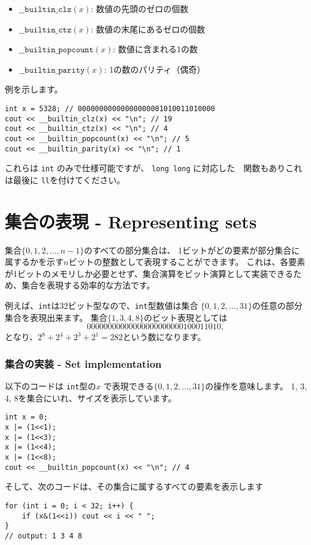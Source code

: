 \begin{itemize}
\item
$\texttt{\_\_builtin\_clz}(x)$:
数値の先頭のゼロの個数
\item
$\texttt{\_\_builtin\_ctz}(x)$:
数値の末尾にあるゼロの個数
\item
$\texttt{\_\_builtin\_popcount}(x)$:
数値に含まれる1の数
\item
$\texttt{\_\_builtin\_parity}(x)$:
1の数のパリティ（偶奇） 
\end{itemize}
\begin{samepage}

例を示します。
\begin{lstlisting}
int x = 5328; // 00000000000000000001010011010000
cout << __builtin_clz(x) << "\n"; // 19
cout << __builtin_ctz(x) << "\n"; // 4
cout << __builtin_popcount(x) << "\n"; // 5
cout << __builtin_parity(x) << "\n"; // 1
\end{lstlisting}
\end{samepage}

これらは \texttt{int} のみで仕様可能ですが、
\texttt{long long} に対応した　関数もありこれは最後に \texttt{ll}を付けてください。

\section{集合の表現 - Representing sets}

集合$\{0,1,2,\ldots,n-1\}$のすべての部分集合は、
1ビットがどの要素が部分集合に属するかを示す$n$ビットの整数として表現することができます。
これは、各要素が1ビットのメモリしか必要とせず、集合演算をビット演算として実装できるため、集合を表現する効率的な方法です。

例えば、\texttt{int}は32ビット型なので、\texttt{int}型数値は集合
$\{0,1,2,\ldots,31\}$の任意の部分集合を表現出来ます。
集合$\{1,3,4,8\}$のビット表現としては
\[00000000000000000000000100011010,\]
となり、$2^8+2^4+2^3+2^1=282$という数になります。

\subsubsection{集合の実装 - Set implementation}

以下のコードは \texttt{int}型の$x$
で表現できる$\{0,1,2,\ldots,31\}$の操作を意味します。
1, 3, 4, 8を集合にいれ、サイズを表示しています。
\begin{lstlisting}
int x = 0;
x |= (1<<1);
x |= (1<<3);
x |= (1<<4);
x |= (1<<8);
cout << __builtin_popcount(x) << "\n"; // 4
\end{lstlisting}
そして、次のコードは、その集合に属するすべての要素を表示します
\begin{lstlisting}
for (int i = 0; i < 32; i++) {
    if (x&(1<<i)) cout << i << " ";
}
// output: 1 3 4 8
\end{lstlisting}

